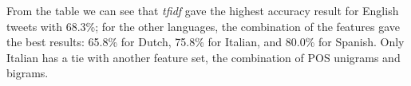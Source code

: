 \documentclass[a4paper]{llncs}
\begin{document}
From the table we can see that \textit{tfidf} gave the highest accuracy result for English tweets with 68.3\%; for the other languages, the combination of the features gave the best results: 65.8\% for Dutch, 75.8\% for Italian, and 80.0\% for Spanish. Only Italian has a tie with another feature set, the combination of POS unigrams and bigrams.   



\end{document}
